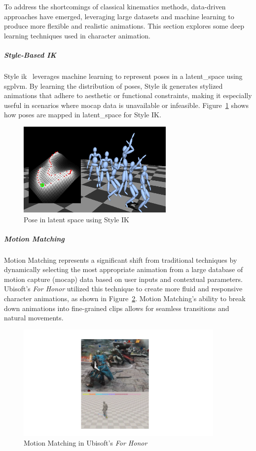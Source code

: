 \documentclass[../../main.tex]{subfiles}
\begin{document}
To address the shortcomings of classical kinematics methods, data-driven approaches have emerged, leveraging large datasets and machine learning to produce more flexible and realistic animations. This section explores some deep learning techniques used in character animation.

\subparagraph{Style-Based IK}
\label{ch:background_work:sign_language_synthesis:3d_techniques:avatar_animation:deep_learning:style_ik}

Style \gls{ik}~\cite{grochow2004style} leverages machine learning to represent poses in a \gls{latent_space} using \gls{sgplvm}. By learning the distribution of poses, Style \gls{ik} generates stylized animations that adhere to aesthetic or functional constraints, making it especially useful in scenarios where mocap data is unavailable or infeasible. Figure~\ref{fig:style_ik} shows how poses are mapped in \gls{latent_space} for Style IK.

\begin{figure}
  \centering \includegraphics[width = 3in]{chapters/background_work/images/style_ik.png}
  \caption{Pose in latent space using Style IK}
  \label{fig:style_ik}
\end{figure}

\subparagraph{Motion Matching}
\label{ch:background_work:sign_language_synthesis:3d_techniques:avatar_animation:deep_learning:motion_matching}

Motion Matching represents a significant shift from traditional techniques by dynamically selecting the most appropriate animation from a large database of motion capture (mocap) data based on user inputs and contextual parameters. Ubisoft's \emph{For Honor} utilized this technique to create more fluid and responsive character animations, as shown in Figure~\ref{fig:for_honor}. Motion Matching's ability to break down animations into fine-grained clips allows for seamless transitions and natural movements.

\begin{figure}
  \centering \includegraphics[width = 4in]{chapters/background_work/images/for_honor.png}
  \caption{Motion Matching in Ubisoft’s \emph{For Honor}}
  \label{fig:for_honor}
\end{figure}
\end{document}

